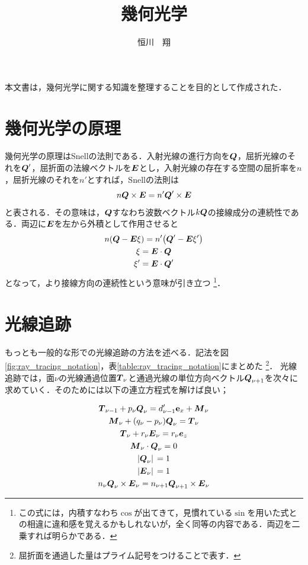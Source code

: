 \documentclass{jsarticle}
\begin{document}
\title{幾何光学}
\author{恒川　翔}
\maketitle
本文書は，幾何光学に関する知識を整理することを目的として作成された．

\tableofcontents

\newpage

\section{幾何光学の原理}
\label{sec:principle}
幾何光学の原理はSnellの法則である．入射光線の進行方向を$\vb*{Q}$，屈折光線のそれを$\vb*{Q}'$，屈折面の法線ベクトルを$\vb*{E}$とし，入射光線の存在する空間の屈折率を$n$，屈折光線のそれを$n'$とすれば，Snellの法則は
\begin{equation}
    n\vb*{Q}\times\vb*{E}=n'\vb*{Q}'\times\vb*{E}
\end{equation}
と表される．その意味は，$\vb*{Q}$すなわち波数ベクトル$k\vb*{Q}$の接線成分の連続性である．両辺に$\vb*{E}$を左から外積として作用させると
\begin{gather}
    n\qty(\vb*{Q}-\vb*{E}\xi)=n'\qty(\vb*{Q}'-\vb*{E}\xi')
    \label{eq:snell}\\
    \xi=\vb*{E}\cdot\vb*{Q}\\
    \xi'=\vb*{E}\cdot\vb*{Q}'
\end{gather}
となって，より接線方向の連続性という意味が引き立つ
\footnote{
    この式には，内積すなわち$\cos$が出てきて，見慣れている$\sin$を用いた式との相違に違和感を覚えるかもしれないが，全く同等の内容である．両辺を二乗すれば明らかである．
}．

\section{光線追跡}
\label{sec:ray_tracing}
もっとも一般的な形での光線追跡の方法を述べる．記法を図\ref{fig:ray_tracing_notation}，表\ref{table:ray_tracing_notation}にまとめた
\footnote{
    屈折面を通過した量はプライム記号をつけることで表す．
}．
光線追跡では，面$\nu$の光線通過位置$\vb*{T}_{\nu}$と通過光線の単位方向ベクトル$\vb*{Q}_{\nu+1}$を次々に求めていく．そのためには以下の連立方程式を解けば良い；

\begin{gather}
    \vb*{T}_{\nu-1}+p_\nu\vb*{Q}_\nu=d_{\nu-1}'\vb{e}_x+\vb*{M}_\nu
    \label{eq:ray_tracing_1}\\
    \vb*{M}_\nu+(q_\nu-p_\nu)\vb*{Q}_\nu=\vb*{T}_\nu
    \label{eq:ray_tracing_2}\\
    \vb*{T}_\nu+r_\nu\vb*{E}_\nu=r_\nu\vb*{e}_z
    \label{eq:ray_tracing_3}\\
    \vb*{M}_\nu\cdot\vb*{Q}_\nu=0
    \label{eq:ray_tracing_4}\\
    \abs*{\vb*{Q}_\nu}=1
    \label{eq:ray_tracing_5}\\
    \abs*{\vb*{E}_\nu}=1
    \label{eq:ray_tracing_6}\\
    n_\nu\vb*{Q}_\nu\times\vb*{E}_\nu=n_{\nu+1}\vb*{Q}_{\nu+1}\times\vb*{E}_{\nu}
    \label{eq:ray_tracing_7}
\end{gather}
\end{document}
